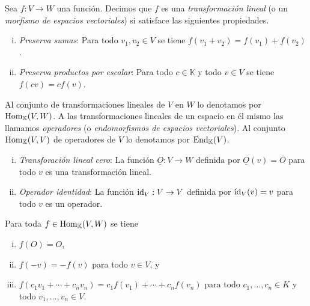 \begin{defn}\label{deftrli}
Sea $f:V\rightarrow W$ una funci\'on. Decimos que $f$ es una \emph{transformaci\'on lineal} (o un \emph{morfismo de espacios vectoriales}) si satisface las siguientes propiedades.
\begin{enumerate}[(i)]
\item \emph{Preserva sumas}: Para todo $v_1,v_2\in V$ se tiene $f(v_1+v_2)=f(v_1)+f(v_2)$.
\item \emph{Preserva productos por escalar}: Para todo $c\in \mathbb{K}$ y todo $v\in V$ se tiene $f(cv)=cf(v)$. 
\end{enumerate}
Al conjunto de transformaciones lineales de $V$ en $W$ lo denotamos por $\operatorname{Hom}_{\mathbb{K}}(V,W)$. A las transformaciones lineales de un espacio en \'el mismo las llamamos \emph{operadores} (o \emph{endomorfismos de espacios vectoriales}). Al conjunto $\operatorname{Hom}_{\mathbb{K}}(V,V)$ de operadores de $V$ lo denotamos por $\operatorname{End}_{\mathbb{K}}(V)$.
\end{defn}

\begin{ejem}
\begin{enumerate}[(i)]
\item \emph{Transforaci\'on lineal cero}: La funci\'on $\underline{O}:V\rightarrow W$ definida por $\underline{O}(v)=O$ para todo $v$ es una transformaci\'on lineal.
\item \emph{Operador identidad}: La funci\'on $\operatorname{id}_V:V\rightarrow V$ definida por $\operatorname{id}_V(v)=v$ para todo $v$ es un operador.
\end{enumerate}  
\end{ejem}

\begin{prop}\label{proptrlinbasicas}
Para toda $f\in\operatorname{Hom}_{\mathbb{K}}(V,W)$ se tiene
\begin{enumerate}[(i)]
\item $f(O)=O$,
\item $f(-v)=-f(v)$ para todo $v\in V$, y
\item $f(c_1v_1+\cdots+c_nv_n)=c_1f(v_1)+\cdots+c_nf(v_n)$ para todo $c_1,\ldots,c_n\in K$ y todo $v_1,\ldots,v_n\in V$.
\end{enumerate}
\end{prop}


